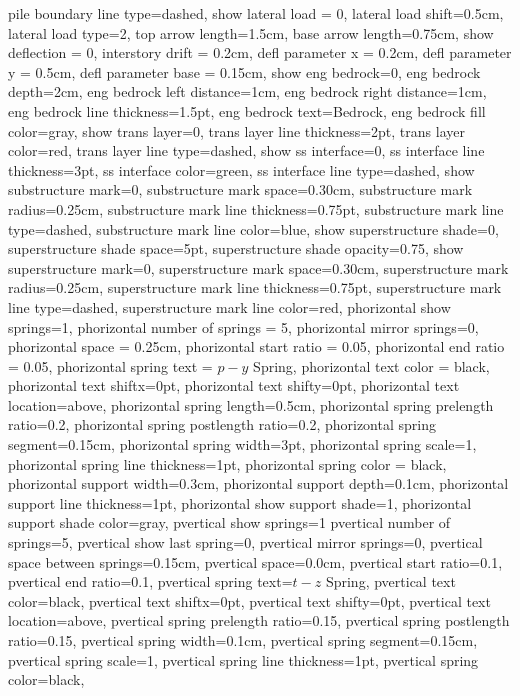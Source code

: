 {{pile boundary line type=dashed,
show lateral load = 0,
lateral load shift=0.5cm,
lateral load type=2,
top arrow length=1.5cm,
base arrow length=0.75cm,
show deflection = 0, 
interstory drift = 0.2cm,
defl parameter x = 0.2cm,
defl parameter y = 0.5cm,
defl parameter base = 0.15cm,
show eng bedrock=0,
eng bedrock depth=2cm,
eng bedrock left distance=1cm,
eng bedrock right distance=1cm,
eng bedrock line thickness=1.5pt,
eng bedrock text=Bedrock,
eng bedrock fill color=gray,
show trans layer=0,
trans layer line thickness=2pt,
trans layer color=red,
trans layer line type=dashed,
show ss interface=0,
ss interface line thickness=3pt,
ss interface color=green,
ss interface line type=dashed,
show substructure mark=0,
substructure mark space=0.30cm,
substructure mark radius=0.25cm,
substructure mark line thickness=0.75pt,
substructure mark line type=dashed,
substructure mark line color=blue,
show superstructure shade=0,
superstructure shade space=5pt,
superstructure shade opacity=0.75,
show superstructure mark=0,
superstructure mark space=0.30cm,
superstructure mark radius=0.25cm,
superstructure mark line thickness=0.75pt,
superstructure mark line type=dashed,
superstructure mark line color=red,
phorizontal show springs=1,
phorizontal number of springs = 5,
phorizontal mirror springs=0,
phorizontal space = 0.25cm,
phorizontal start ratio = 0.05,
phorizontal end ratio = 0.05,
phorizontal spring text = {$p-y$ Spring},
phorizontal text color = black,
phorizontal text shiftx=0pt,
phorizontal text shifty=0pt,
phorizontal text location=above,
phorizontal spring length=0.5cm,
phorizontal spring prelength ratio=0.2,
phorizontal spring postlength ratio=0.2,
phorizontal spring segment=0.15cm,
phorizontal spring width=3pt,
phorizontal spring scale=1,
phorizontal spring line thickness=1pt,
phorizontal spring color = black,
phorizontal support width=0.3cm,
phorizontal support depth=0.1cm,
phorizontal support line thickness=1pt,
phorizontal show support shade=1,
phorizontal support shade color=gray,
pvertical show springs=1
pvertical number of springs=5,
pvertical show last spring=0,
pvertical mirror springs=0,
pvertical space between springs=0.15cm,
pvertical space=0.0cm,
pvertical start ratio=0.1,
pvertical end ratio=0.1,
pvertical spring text={$t-z$ Spring},
pvertical text color=black,
pvertical text shiftx=0pt,
pvertical text shifty=0pt,
pvertical text location=above,
pvertical spring prelength ratio=0.15,
pvertical spring postlength ratio=0.15,
pvertical spring width=0.1cm,
pvertical spring segment=0.15cm,
pvertical spring scale=1,
pvertical spring line thickness=1pt,
pvertical spring color=black,
}}
